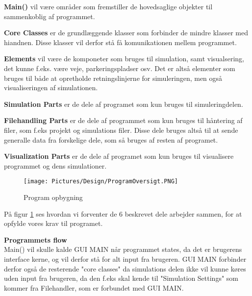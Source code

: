 \textbf{Main()} vil være områder som fremstiller de hovedsaglige objekter til sammenkoblig af programmet.

\vspace{5mm}

\textbf{Core Classes} er de grundlæggende klasser som forbinder de mindre klasser med hiandnen. Disse klasser vil derfor stå få komunikationen mellem programmet.

\vspace{5mm}

\textbf{Elements} vil være de komponeter som bruges til simulation, samt visualsering, det kunne f.eks. være veje, parkeringspladser osv. Det er altså elementer som bruges til både at opretholde retningslinjerne for simuleringen, men også visualiseringen af simulationen.

\vspace{5mm}

\textbf{Simulation Parts} er de dele af programet som kun bruges til simuleringdelen.

\vspace{5mm}

\textbf{Filehandling Parts} er de dele af programmet som kun bruges til håntering af filer, som f.eks projekt og simulations filer. Disse dele bruges altså til at sende generalle data fra forskelige dele, som så bruges af resten af programet.  

\vspace{5mm}

\textbf{Visualization Parts} er de dele af programet som kun bruges til visualisere programmet og dens simulationer.

\begin{figure}[H]
\begin{adjustbox}{width=1.0\textwidth,center=\textwidth}
\centering
\texttt{[image: Pictures/Design/ProgramOversigt.PNG]}
\end{adjustbox}
\caption{Program opbygning}
\label{fig:ProgramOversigt}
\end{figure}

\vspace{5mm}

På figur \ref{fig:ProgramOversigt} ses hvordan vi forventer de 6 beskrevet dele arbejder sammen, for at opfylde vores krav til programet.

\vspace{5mm}

\textbf{Programmets flow} \\
Main() vil skulle kalde GUI MAIN når programmet states, da det er brugerens interface kerne, og vil derfor stå for alt input fra brugeren. GUI MAIN forbinder derfor også de resterende "core classes" da simulations delen ikke vil kunne køres uden input fra brugeren, da den f.eks skal kende til "Simulation Settings" som kommer fra Filehandler, som er forbundet med GUI MAIN. \\

